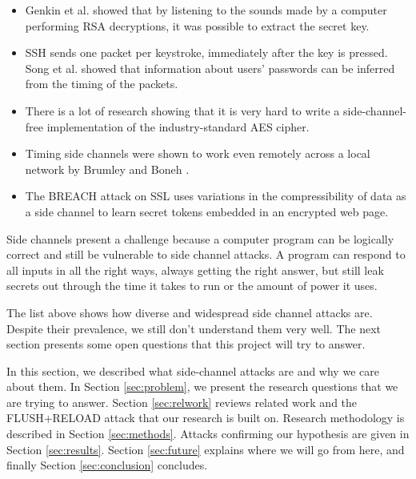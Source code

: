 \documentclass{acm_proc_article-sp}
\begin{document}
\begin{itemize}
\item Genkin et al. \cite{genkin2013rsa} showed that by listening to the sounds
made by a computer performing RSA decryptions, it was possible to extract the
secret key.

\item SSH sends one packet per keystroke, immediately after the key is pressed.
Song et al. \cite{song2001timing} showed that information about users' passwords
can be inferred from the timing of the packets.

\item There is a lot of research \cite{aciiccmez2006cache, bernstein2005cache,
    osvik2006cache, weiss2012cache} showing that it is very hard to write
    a side-channel-free implementation of the industry-standard AES cipher.

\item Timing side channels were shown to work even remotely across a local
network by Brumley and Boneh \cite{brumley2005remote}.

\item The BREACH attack on SSL \cite{gluck2013breach} uses variations in the
    compressibility of data as a side channel to learn secret tokens embedded in
    an encrypted web page.
\end{itemize}

Side channels present a challenge because a computer program can be logically
correct and still be vulnerable to side channel attacks. A program can respond
to all inputs in all the right ways, always getting the right answer, but still
leak secrets out through the time it takes to run or the amount of power it
uses.

The list above shows how diverse and widespread side channel attacks are.
Despite their prevalence, we still don't understand them very well. The next
section presents some open questions that this project will try to answer.

In this section, we described what side-channel attacks are and why we care
about them. In Section \ref{sec:problem}, we present the research questions that
we are trying to answer. Section \ref{sec:relwork} reviews related work and the
FLUSH+RELOAD attack that our research is built on. Research methodology is
described in Section \ref{sec:methods}. Attacks confirming our hypothesis are
given in Section \ref{sec:results}. Section \ref{sec:future} explains where we
will go from here, and finally Section \ref{sec:conclusion} concludes.
\end{document}
